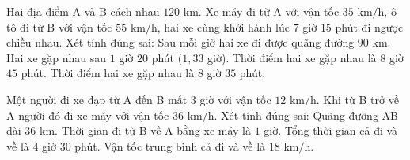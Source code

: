 \begin{ex} %
Hai địa điểm A và B cách nhau $120\text{ km}$. Xe máy đi từ A với vận tốc $35\text{ km/h}$, ô tô đi từ B với vận tốc $55\text{ km/h}$, hai xe cùng khởi hành lúc $7$ giờ $15$ phút đi ngược chiều nhau. Xét tính đúng sai:
\choiceTF
{\True Sau mỗi giờ hai xe đi được quãng đường $90\text{ km}$.}
{\True Hai xe gặp nhau sau $1$ giờ $20$ phút ($1{,}33$ giờ).}
{Thời điểm hai xe gặp nhau là $8$ giờ $45$ phút.}
{\True Thời điểm hai xe gặp nhau là $8$ giờ $35$ phút.}
\end{ex}

\begin{ex} %
Một người đi xe đạp từ A đến B mất $3$ giờ với vận tốc $12\text{ km/h}$. Khi từ B trở về A người đó đi xe máy với vận tốc $36\text{ km/h}$. Xét tính đúng sai:
\choiceTF
{\True Quãng đường AB dài $36\text{ km}$.}
{\True Thời gian đi từ B về A bằng xe máy là $1$ giờ.}
{Tổng thời gian cả đi và về là $4$ giờ $30$ phút.}
{\True Vận tốc trung bình cả đi và về là $18\text{ km/h}$.}
\end{ex}


